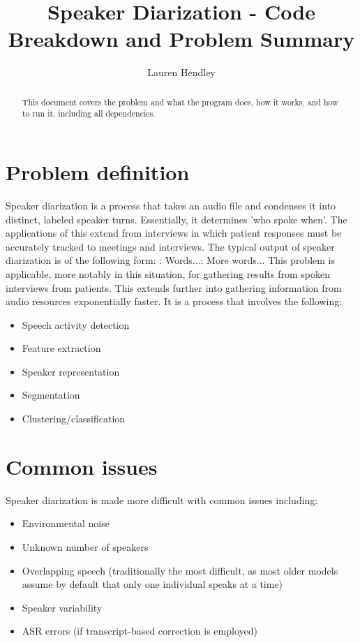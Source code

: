 \documentclass{article}
\title{Speaker Diarization - Code Breakdown and Problem Summary}
\author{Lauren Hendley}
\begin{document}
\maketitle

\begin{abstract}
This document covers the problem and what the program does, how it works, and how to run it, including all dependencies.
\end{abstract}

\section{Problem definition}
Speaker diarization is a process that takes an audio file and condenses it into distinct, labeled speaker turns. Essentially, it determines 'who spoke when'. The applications of this extend from interviews in which patient responses must be accurately tracked to meetings and interviews.
The typical output of speaker diarization is of the following form:\newline
\newline
[SPEAKER0] : Words...\newline
[SPEAKER1] : More words...\newline
\newline
This problem is applicable, more notably in this situation, for gathering results from spoken interviews from patients. This extends further into gathering information from audio resources exponentially faster. \newline
It is a process that involves the following:
\begin{itemize}
    \item Speech activity detection
    \item Feature extraction
    \item Speaker representation
    \item Segmentation
    \item Clustering/classification
\end{itemize}

\section{Common issues}
Speaker diarization is made more difficult with common issues including:
\begin{itemize}
  \item Environmental noise
  \item Unknown number of speakers
  \item Overlapping speech (traditionally the most difficult, as most older models assume by default that only one individual speaks at a time)
  \item Speaker variability
  \item ASR errors (if transcript-based correction is employed)
\end{itemize}
\end{document}
